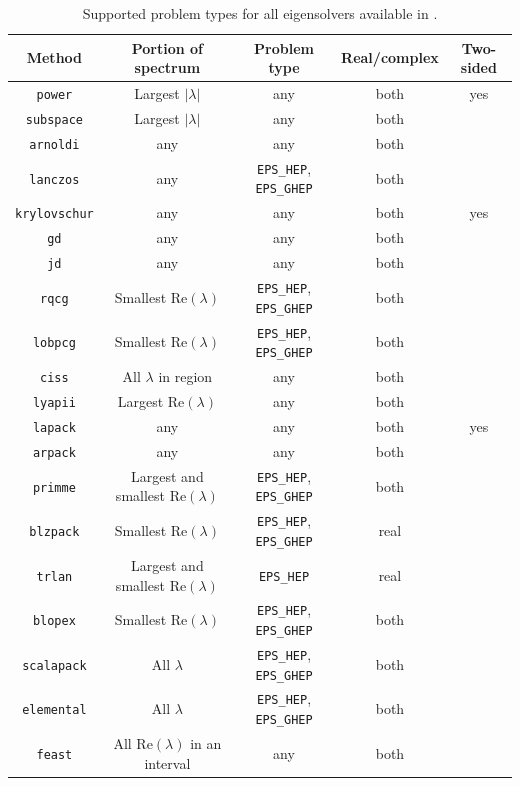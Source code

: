 \begin{table}[t]
\centering
\begin{tabular}{ccccc} \hline
Method   &  Portion of spectrum & Problem type & \!Real/complex\! & \!Two-sided\!\\ \hline
\texttt{power}       & Largest $|\lambda|$ & any & both & yes\\
\texttt{subspace}    & Largest $|\lambda|$ & any & both & \\
\texttt{arnoldi}     & any    & any & both & \\
\texttt{lanczos}     & any    & \Verb!EPS_HEP!, \Verb!EPS_GHEP! & both & \\
\!\texttt{krylovschur}\! & any    & any & both & yes \\
\texttt{gd}          & any    & any & both & \\
\texttt{jd}          & any    & any & both & \\
\texttt{rqcg}        & Smallest $\mathrm{Re}(\lambda)$ & \Verb!EPS_HEP!, \Verb!EPS_GHEP! & both & \\
\texttt{lobpcg}      & Smallest $\mathrm{Re}(\lambda)$ & \Verb!EPS_HEP!, \Verb!EPS_GHEP! & both & \\
\texttt{ciss}        & All $\lambda$ in region & any & both & \\
\texttt{lyapii}      & Largest $\mathrm{Re}(\lambda)$ & any & both & \\
\hline
\texttt{lapack}      & any    & any & both & yes \\
\texttt{arpack}      & any    & any & both & \\
\texttt{primme}      & Largest and smallest $\mathrm{Re}(\lambda)$ & \Verb!EPS_HEP!, \Verb!EPS_GHEP! & both & \\
\texttt{blzpack}     & Smallest $\mathrm{Re}(\lambda)$ & \Verb!EPS_HEP!, \Verb!EPS_GHEP!& real & \\
\texttt{trlan}       & Largest and smallest $\mathrm{Re}(\lambda)$ & \Verb!EPS_HEP! & real & \\
\texttt{blopex}      & Smallest $\mathrm{Re}(\lambda)$ & \Verb!EPS_HEP!, \Verb!EPS_GHEP! & both & \\
\texttt{scalapack}   & All $\lambda$ & \Verb!EPS_HEP!, \Verb!EPS_GHEP! & both & \\
\texttt{elemental}   & All $\lambda$ & \Verb!EPS_HEP!, \Verb!EPS_GHEP! & both & \\
\texttt{feast}       & All $\mathrm{Re}(\lambda)$ in an interval & any & both & \\ \hline
\end{tabular}
\caption{\label{tab:support}Supported problem types for all eigensolvers available in \slepc.}
\end{table}

